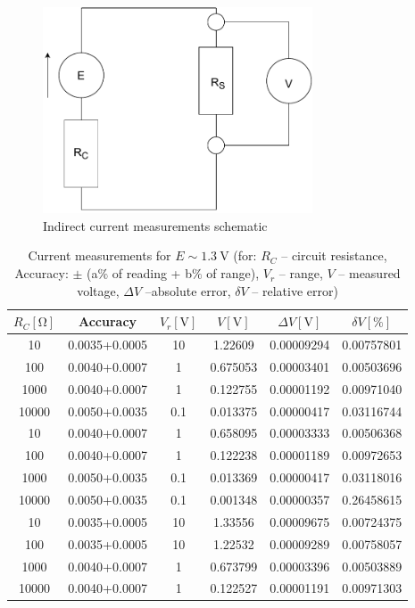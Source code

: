 \begin{figure}[H]
	\centering
	\includegraphics[width=8cm]{schematics/indirect.pdf}
	\caption{Indirect current measurements schematic}
	\label{fig:indirect_schematic}
\end{figure}

\begin{table}[H]
	\centering
	\begin{tabular}{ c | c | c | c | c | c  }
		$R_C [\unit{\ohm}]$& Accuracy & $V_r [\unit{\volt}]$ & $V [\unit{\volt}]$ & $\Delta V [\unit{\volt}]$ & $\delta V [\unit{\percent}]$ \\
		\hline
			10	& 0.0035+0.0005	& 10	& 1.22609&	0.00009294 &	0.00757801\\
			100	& 0.0040+0.0007	&1&	0.675053	& 0.00003401&0.00503696\\
			1000 &	0.0040+0.0007	&1&	0.122755	&0.00001192&	0.00971040\\
			10000	& 0.0050+0.0035	&0.1&	0.013375&	0.00000417 &	0.03116744\\
			10	&0.0040+0.0007	&1&	0.658095&	0.00003333 &	0.00506368\\
			100	&0.0040+0.0007	&1	&0.122238	&0.00001189&	0.00972653\\
			1000	&0.0050+0.0035&	0.1&	0.013369&	0.00000417&	0.03118016\\
			10000&	0.0050+0.0035	&0.1&	0.001348&	0.00000357&	0.26458615\\
			10	& 0.0035+0.0005	&10	&1.33556 &	0.00009675&	0.00724375\\
			100	&0.0035+0.0005	&10&	1.22532&	0.00009289&	0.00758057\\
			1000	&0.0040+0.0007	&1&	0.673799	&0.00003396&	0.00503889\\
			10000	&0.0040+0.0007	&1&	0.122527	&0.00001191&	0.00971303\\
	\end{tabular}
	\caption{Current measurements for $E\sim\SI{1.3}{\volt}$ (for: $R_C$ -- circuit resistance, Accuracy: $\pm$ (a$\unit{\percent}$ of reading + b$\unit{\percent}$ of range), $V_r$ -- range, $V$ -- measured voltage, $\Delta V$ --absolute error, $\delta V$ -- relative error)}
	\label{tab:indirect_digital_1}
\end{table}

